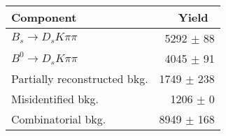  \begin{tabular}{l r }
\hline\hline
Component & Yield\ \\
\hline
$B_s \to D_s K \pi \pi$ & 5292 $\pm$ 88 \\
$B^{0} \to D_s K \pi \pi$ & 4045 $\pm$ 91 \\
Partially reconstructed bkg. & 1749 $\pm$ 238 \\
Misidentified bkg. & 1206 $\pm$ 0 \\
Combinatorial bkg. & 8949 $\pm$ 168 \\
\hline\hline
\end{tabular}
\label{table:signalYields}
